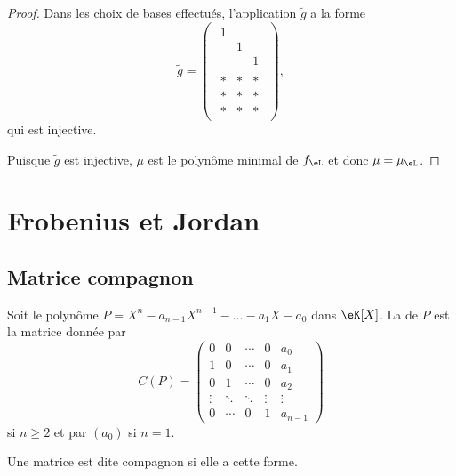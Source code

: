 \begin{proof}
	Dans les choix de bases effectués, l'application \( \tilde g\) a la forme
	\begin{equation}
		\tilde g=\begin{pmatrix}
			\begin{matrix}
				1 &   &   \\
				  & 1 &   \\
				  &   & 1
			\end{matrix} \\
			\begin{matrix}
				* & * & * \\
				* & * & * \\
				* & * & *
			\end{matrix}
		\end{pmatrix},
	\end{equation}
	qui est injective.

	Puisque \( \tilde g\) est injective, \( \mu\) est le polynôme minimal de \( f_{\eL}\) et donc \( \mu=\mu_{\eL}\).
\end{proof}

\section{Frobenius et Jordan}

\subsection{Matrice compagnon}

\begin{definition}      \label{DEFooOSVAooGevsda}
	Soit le polynôme \( P=X^n-a_{n-1}X^{n-1}-\ldots-a_1X-a_0\) dans \( \eK[X]\). La  de \( P\) est la matrice donnée par
	\begin{equation}
		C(P)=\begin{pmatrix}
			0      & 0      & \cdots & 0      & a_0     \\
			1      & 0      & \cdots & 0      & a_1     \\
			0      & 1      & \cdots & 0      & a_2     \\
			\vdots & \ddots & \ddots & \vdots & \vdots  \\
			0      & \cdots & 0      & 1      & a_{n-1}
		\end{pmatrix}
	\end{equation}
	si \( n\geq 2\) et par \( (a_0)\) si \( n=1\).

	Une matrice est dite compagnon si elle a cette forme.
\end{definition}

